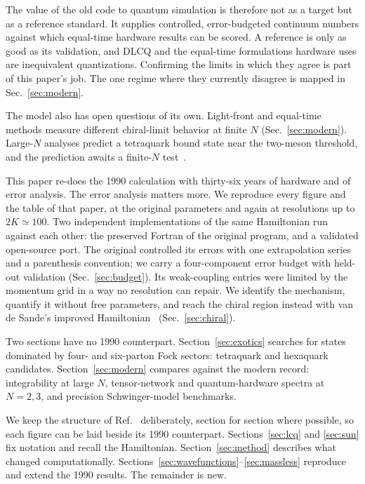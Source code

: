 The value of the old code to quantum simulation is therefore not as a
target but as a reference standard.  It supplies controlled,
error-budgeted continuum numbers against which equal-time hardware results
can be scored.  A reference is only as good as its validation, and DLCQ and
the equal-time formulations hardware uses are inequivalent quantizations.
Confirming the limits in which they agree is part of this paper's job.  The
one regime where they currently disagree is mapped in
Sec.~\ref{sec:modern}.

The model also has open questions of its own.  Light-front and equal-time
methods measure different chiral-limit behavior at finite $N$
(Sec.~\ref{sec:modern}).  Large-$N$ analyses predict a tetraquark bound
state near the two-meson threshold, and the prediction awaits a finite-$N$
test~\cite{Sazdjian:2025mqg,Lucha:2017gqq}.

This paper re-does the 1990 calculation with thirty-six years of hardware
and of error analysis.  The error analysis matters more.  We reproduce every figure and
the table of that paper, at the original parameters and again at
resolutions up to $2K \simeq 100$.  Two independent implementations of the
same Hamiltonian run against each other: the preserved Fortran of the
original program, and a validated open-source port.  The original
controlled its errors with one extrapolation series and a parenthesis
convention; we carry a four-component error budget with held-out validation
(Sec.~\ref{sec:budget}).  Its weak-coupling entries were limited by the
momentum grid in a way no resolution can repair.  We identify the
mechanism, quantify it without free parameters, and reach the chiral region
instead with van de Sande's improved
Hamiltonian~\cite{vandeSande:1996mc} (Sec.~\ref{sec:chiral}).

Two sections have no 1990 counterpart.  Section~\ref{sec:exotics} searches
for states dominated by four- and six-parton Fock sectors: tetraquark and
hexaquark candidates.  Section~\ref{sec:modern} compares against the modern
record: integrability at large $N$, tensor-network and quantum-hardware
spectra at $N = 2, 3$, and precision Schwinger-model benchmarks.

We keep the structure of Ref.~\cite{Hornbostel:1988fb} deliberately,
section for section where possible, so each figure can be laid beside its
1990 counterpart.  Sections~\ref{sec:lcq} and \ref{sec:sun} fix notation
and recall the Hamiltonian.  Section~\ref{sec:method} describes what
changed computationally.
Sections~\ref{sec:wavefunctions}--\ref{sec:massless} reproduce and extend
the 1990 results.  The remainder is new.
